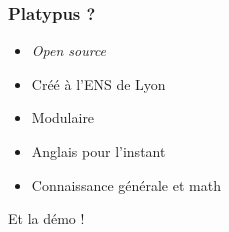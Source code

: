 \begin{frame}
    \frametitle{Platypus ?}
    \begin{itemize}
        \item<1-> \alert{\textit{Open source}}
        \item<2-> Créé à l'\alert{ENS de Lyon}
        \item<2-> \alert{Modulaire}
        \item<3-> \alert{Anglais} pour l'instant
        \item<4-> \alert{Connaissance générale} et math
    \end{itemize}
\end{frame}

\begin{frame}
    \begin{center}
        \Huge Et la démo !
    \end{center}
\end{frame}
